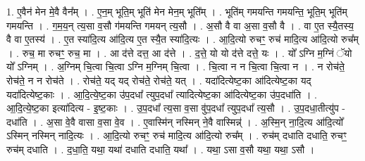 \documentclass[17pt]{extarticle}
\begin{document}
1. ए॒वैन॑ मेन मे॒वै वैन᳚म् । . ए॒न॒म् भूति॒म् भूति॑ मेन मेन॒म् भूति᳚म् । . भूति॑म् गमयन्ति गमयन्ति॒ भूति॒म् भूति॑म् गमयन्ति । . ग॒म॒य॒न् त्य॒सा व॒सौ ग॑मयन्ति गमयन् त्य॒सौ । . अ॒सौ वै वा अ॒सा व॒सौ वै । . वा ए॒त स्यै॒तस्य॒ वै वा ए॒तस्य॑ । . ए॒त स्या॑दि॒त्य आ॑दि॒त्य ए॒त स्यै॒त स्या॑दि॒त्यः । . आ॒दि॒त्यो रुचꣳ॒॒ रुच॑ मादि॒त्य आ॑दि॒त्यो रुच᳚म् । . रुच॒ मा रुचꣳ॒॒ रुच॒ मा । . आ द॑त्ते दत्त॒ आ द॑त्ते । . द॒त्ते॒ यो यो द॑त्ते दत्ते॒ यः । . यो᳚ ऽग्नि म॒ग्निं ॅयो यो᳚ ऽग्निम् । . अ॒ग्निम् चि॒त्वा चि॒त्वा ऽग्नि म॒ग्निम् चि॒त्वा । . चि॒त्वा न न चि॒त्वा चि॒त्वा न । . न रोच॑ते॒ रोच॑ते॒ न न रोच॑ते । . रोच॑ते॒ यद् यद् रोच॑ते॒ रोच॑ते॒ यत् । . यदा॑दित्येष्ट॒का आ॑दित्येष्ट॒का यद् यदा॑दित्येष्ट॒काः । . आ॒दि॒त्ये॒ष्ट॒का उ॑प॒दधा᳚ त्युप॒दधा᳚ त्यादित्येष्ट॒का आ॑दित्येष्ट॒का उ॑प॒दधा॑ति । . आ॒दि॒त्ये॒ष्ट॒का इत्या॑दित्य - इ॒ष्ट॒काः । . उ॒प॒दधा᳚ त्य॒सा व॒सा वु॑प॒दधा᳚ त्युप॒दधा᳚ त्य॒सौ । . उ॒प॒दधा॒तीत्यु॑प - दधा॑ति । . अ॒सा वे॒वै वासा व॒सा वे॒व । . ए॒वास्मि॑न् नस्मिन् ने॒वै वास्मिन्न्॑ । . अ॒स्मि॒न् ना॒दि॒त्य आ॑दि॒त्यो᳚ ऽस्मिन् नस्मिन् नादि॒त्यः । . आ॒दि॒त्यो रुचꣳ॒॒ रुच॑ मादि॒त्य आ॑दि॒त्यो रुच᳚म् । . रुच॑म् दधाति दधाति॒ रुचꣳ॒॒ रुच॑म् दधाति । . द॒धा॒ति॒ यथा॒ यथा॑ दधाति दधाति॒ यथा᳚ । . यथा॒ ऽसा व॒सौ यथा॒ यथा॒ ऽसौ । \newline
\end{document}
